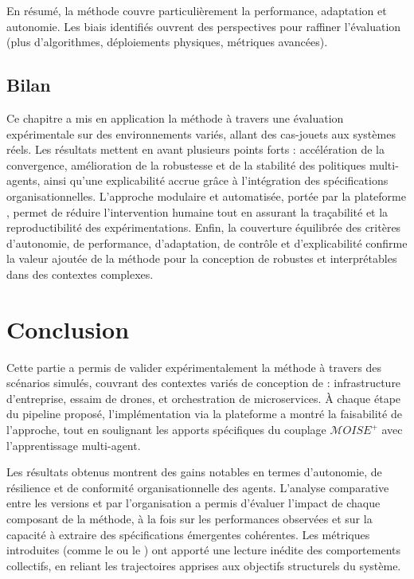 \medskip
En résumé, la méthode  couvre particulièrement la performance, adaptation et autonomie. Les biais identifiés ouvrent des perspectives pour raffiner l'évaluation (plus d'algorithmes, déploiements physiques, métriques avancées).

\section{Bilan}

Ce chapitre a mis en application la méthode  à travers une évaluation expérimentale sur des environnements variés, allant des cas-jouets aux systèmes réels. Les résultats mettent en avant plusieurs points forts : accélération de la convergence, amélioration de la robustesse et de la stabilité des politiques multi-agents, ainsi qu'une explicabilité accrue grâce à l'intégration des spécifications organisationnelles. L'approche modulaire et automatisée, portée par la plateforme , permet de réduire l'intervention humaine tout en assurant la traçabilité et la reproductibilité des expérimentations. Enfin, la couverture équilibrée des critères d'autonomie, de performance, d'adaptation, de contrôle et d'explicabilité confirme la valeur ajoutée de la méthode pour la conception de  robustes et interprétables dans des contextes complexes.

\clearpage
\thispagestyle{empty}
\null
\newpage


\chapter*{Conclusion}

Cette partie a permis de valider expérimentalement la méthode  à travers des scénarios simulés, couvrant des contextes variés de conception de  : infrastructure d'entreprise, essaim de drones, et orchestration de microservices. À chaque étape du pipeline proposé, l'implémentation via la plateforme  a montré la faisabilité de l'approche, tout en soulignant les apports spécifiques du couplage $\mathcal{M}OISE^+$ avec l'apprentissage multi-agent.

Les résultats obtenus montrent des gains notables en termes d'autonomie, de résilience et de conformité organisationnelle des agents. L'analyse comparative entre les versions  et  par l'organisation a permis d'évaluer l'impact de chaque composant de la méthode, à la fois sur les performances observées et sur la capacité à extraire des spécifications émergentes cohérentes. Les métriques introduites (comme le  ou le ) ont apporté une lecture inédite des comportements collectifs, en reliant les trajectoires apprises aux objectifs structurels du système.

